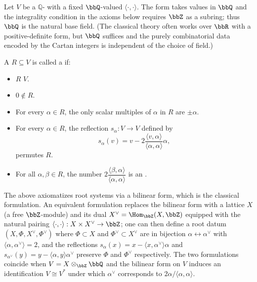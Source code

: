 \begin{definition} \label{definition:root_system_of_a_finite_dimensional_Q_vector_space_with_a_symmetric_bilinear_form}
Let $V$ be a  $\mathbb{Q}$- with a fixed $\bbQ$-valued  $\langle \cdot, \cdot \rangle$.
The form takes values in $\bbQ$ and the integrality condition in the axioms below requires $\bbZ$ as a subring; thus $\bbQ$ is the natural base field. (The classical theory often works over $\bbR$ with a positive-definite form, but $\bbQ$ suffices and the purely combinatorial data encoded by the Cartan integers is independent of the choice of field.)

A   $R \subseteq V$ is called a  if:
\begin{itemize}
  \item $R$  $V$.
  \item $0 \notin R$.
  \item For every $\alpha \in R$, the only scalar multiples of $\alpha$ in $R$ are $\pm\alpha$.
  \item For every $\alpha \in R$, the reflection $s_\alpha: V \to V$ defined by
  $$s_\alpha(v) = v - 2\dfrac{\langle v, \alpha \rangle}{\langle \alpha, \alpha \rangle}\alpha,$$
  permutes $R$.
  \item For all $\alpha, \beta \in R$, the number $2\dfrac{\langle \beta,\alpha \rangle}{\langle \alpha, \alpha \rangle}$ is an .
\end{itemize}

The above axiomatizes root systems via a bilinear form, which is the classical formulation. An equivalent formulation replaces the bilinear form with a lattice $X$ (a free $\bbZ$-module) and its dual $X^\vee = \Hom_{\bbZ}(X,\bbZ)$ equipped with the natural pairing $\langle\cdot,\cdot\rangle: X \times X^\vee \to \bbZ$; one can then define a root datum $(X,\Phi,X^\vee,\Phi^\vee)$ where $\Phi \subset X$ and $\Phi^\vee \subset X^\vee$ are in bijection $\alpha \leftrightarrow \alpha^\vee$ with $\langle\alpha,\alpha^\vee\rangle = 2$, and the reflections $s_\alpha(x) = x - \langle x,\alpha^\vee\rangle\alpha$ and $s_{\alpha^\vee}(y) = y - \langle\alpha,y\rangle\alpha^\vee$ preserve $\Phi$ and $\Phi^\vee$ respectively. The two formulations coincide when $V = X \otimes_{\bbZ} \bbQ$ and the bilinear form on $V$ induces an identification $V \cong V^\ast$ under which $\alpha^\vee$ corresponds to $2\alpha/\langle\alpha,\alpha\rangle$.
\end{definition}